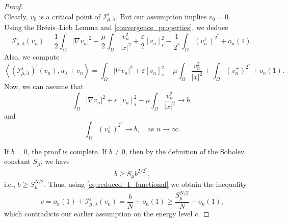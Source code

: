 \documentclass[11pt]{article}
\newcommand{\la} {\lambda}
\newcommand{\Ie}{\mathcal{I}_{\mu,\lambda}^{\varepsilon}} %
\begin{document}
\begin{proof}
\begin{equation}
\end{equation}
Clearly, \( v_0 \) is a critical point of \( \Ie \). But our assumption implies \( v_0 = 0 \).\\
Using the Brézis–Lieb Lemma and \eqref{convergence_properties}, we deduce
\begin{equation}\label{eq:reduced_I_functional}
\Ie(v_n) = \frac{1}{2} \int_{\Omega} |\nabla v_n|^2 - \frac{\mu}{2} \int_{\Omega} \frac{v_n^2}{|x|^2} + \frac{\varepsilon }{2} [v_n]_s^2 - \frac{1}{2^*} \int_{\Omega} (v_n^+)^{2^*} + o_n(1).
\end{equation}
Also, we compute
\begin{equation*} 
\left\langle (\Ie)^{\prime}(v_n), u_\la +v_n \right\rangle = \int_{\Omega} |\nabla v_n|^2 + \varepsilon  [v_n]_s^2 - \mu \int_{\Omega} \frac{v_n^2}{|x|^2} + \int_{\Omega} (v_n^+)^{2^*} + o_n(1).
\end{equation*}
Now, we can assume that
\begin{equation*}
\int_{\Omega} |\nabla v_n|^2 + \varepsilon  [v_n]_s^2 - \mu \int_{\Omega} \frac{v_n^2}{|x|^2} \to b,
\end{equation*}
and
\begin{equation*}
\int_{\Omega} (v_n^+)^{2^*} \to b, \quad \text{as } n \to \infty.
\end{equation*}

If \( b = 0 \), the proof is complete. If \( b \neq 0 \), then by the definition of the Sobolev constant \( S_{\mu} \), we have
\begin{equation*} 
b \geq S_{\mu} b^{2 / 2^*},
\end{equation*}
i.e., $b \geq S_{\mu}^{N/2}$. Thus, using \eqref{eq:reduced_I_functional} we obtain the inequality
\begin{equation*}
c = o_n(1) + \Ie(v_n) = \frac{b}{N} + o_n(1) \geq \frac{S_{\mu}^{N/2}}{N} + o_n(1),
\end{equation*}
which contradicts our earlier assumption on the energy level \( c \).
\end{proof}
\end{document}
